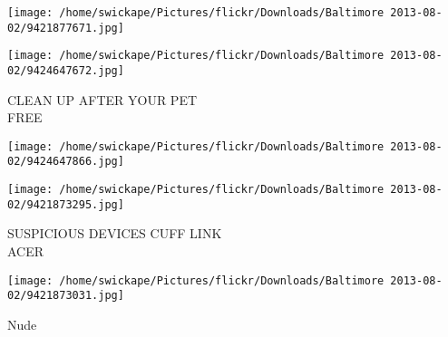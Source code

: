 \documentclass[10pt,letterpaper]{article}
\begin{document}
\texttt{[image: /home/swickape/Pictures/flickr/Downloads/Baltimore 2013-08-02/9421877671.jpg]}

\vspace{0.25in}
\texttt{[image: /home/swickape/Pictures/flickr/Downloads/Baltimore 2013-08-02/9424647672.jpg]}

CLEAN UP AFTER YOUR PET\\
FREE
\pagebreak

\texttt{[image: /home/swickape/Pictures/flickr/Downloads/Baltimore 2013-08-02/9424647866.jpg]}

\vspace{0.25in}
\texttt{[image: /home/swickape/Pictures/flickr/Downloads/Baltimore 2013-08-02/9421873295.jpg]}

SUSPICIOUS DEVICES CUFF LINK\\
ACER
\pagebreak

\texttt{[image: /home/swickape/Pictures/flickr/Downloads/Baltimore 2013-08-02/9421873031.jpg]}

Nude
\pagebreak
\end{document}
